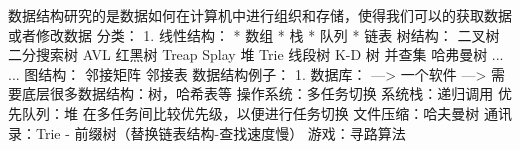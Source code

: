 \markdownRendererInterblockSeparator
{}\markdownRendererInterblockSeparator
{}数据结构研究的是数据如何在计算机中进行组织和存储，使得我们可以的获取数据或者修改数据\markdownRendererInterblockSeparator
{}分类： 1. 线性结构： * 数组 * 栈 * 队列 * 链表\markdownRendererInterblockSeparator
{}\markdownRendererOlBegin
{}树结构：\markdownRendererInterblockSeparator
{}\markdownRendererUlBeginTight
\markdownRendererUlItem 二叉树\markdownRendererUlItemEnd 
\markdownRendererUlItem 二分搜索树\markdownRendererUlItemEnd 
\markdownRendererUlItem AVL\markdownRendererUlItemEnd 
\markdownRendererUlItem 红黑树\markdownRendererUlItemEnd 
\markdownRendererUlItem Treap\markdownRendererUlItemEnd 
\markdownRendererUlItem Splay\markdownRendererUlItemEnd 
\markdownRendererUlItem 堆\markdownRendererUlItemEnd 
\markdownRendererUlItem Trie\markdownRendererUlItemEnd 
\markdownRendererUlItem 线段树\markdownRendererUlItemEnd 
\markdownRendererUlItem K-D 树\markdownRendererUlItemEnd 
\markdownRendererUlItem 并查集\markdownRendererUlItemEnd 
\markdownRendererUlItem 哈弗曼树\markdownRendererUlItemEnd 
\markdownRendererUlItem ... ...\markdownRendererUlItemEnd 
\markdownRendererUlEndTight \markdownRendererOlItemEnd 
{}图结构：\markdownRendererInterblockSeparator
{}\markdownRendererUlBeginTight
\markdownRendererUlItem 邻接矩阵\markdownRendererUlItemEnd 
\markdownRendererUlItem 邻接表\markdownRendererUlItemEnd 
\markdownRendererUlEndTight \markdownRendererOlItemEnd 
\markdownRendererOlEnd \markdownRendererInterblockSeparator
{}数据结构例子： 1. 数据库： ---> 一个软件 ---> 需要底层很多数据结构：树，哈希表等\markdownRendererInterblockSeparator
{}\markdownRendererOlBegin
{}操作系统：多任务切换\markdownRendererInterblockSeparator
{}\markdownRendererOlBeginTight
{}系统栈：递归调用\markdownRendererOlItemEnd 
{}优先队列：堆\markdownRendererInterblockSeparator
{}\markdownRendererUlBeginTight
\markdownRendererUlItem 在多任务间比较优先级，以便进行任务切换\markdownRendererUlItemEnd 
\markdownRendererUlEndTight \markdownRendererOlItemEnd 
\markdownRendererOlEndTight \markdownRendererOlItemEnd 
{}文件压缩：哈夫曼树\markdownRendererOlItemEnd 
{}通讯录：Trie - 前缀树（替换链表结构-查找速度慢）\markdownRendererOlItemEnd 
{}游戏：寻路算法\markdownRendererInterblockSeparator
